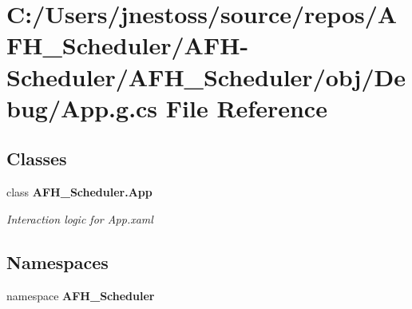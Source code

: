 \section{C\+:/\+Users/jnestoss/source/repos/\+A\+F\+H\+\_\+\+Scheduler/\+A\+F\+H-\/\+Scheduler/\+A\+F\+H\+\_\+\+Scheduler/obj/\+Debug/\+App.g.\+cs File Reference}
\label{_debug_2_app_8g_8cs}
\subsection*{Classes}
\begin{DoxyCompactItemize}
\item 
class \textbf{ A\+F\+H\+\_\+\+Scheduler.\+App}
\begin{DoxyCompactList}\small\item\em Interaction logic for App.\+xaml \end{DoxyCompactList}\end{DoxyCompactItemize}
\subsection*{Namespaces}
\begin{DoxyCompactItemize}
\item 
namespace \textbf{ A\+F\+H\+\_\+\+Scheduler}
\end{DoxyCompactItemize}
